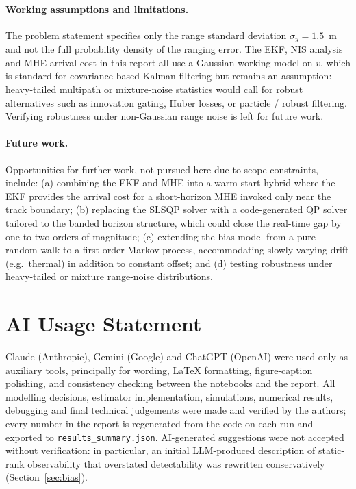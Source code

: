 \documentclass[11pt,a4paper]{article}
\newcommand{\code}[1]{\texttt{#1}}
\begin{document}
\paragraph{Working assumptions and limitations.}
The problem statement specifies only the range standard deviation
$\sigma_y=1.5$~m and not the full probability density of the
ranging error. The EKF, NIS analysis and MHE arrival cost in this
report all use a Gaussian working model on $v$, which is standard
for covariance-based Kalman filtering but remains an assumption:
heavy-tailed multipath or mixture-noise statistics would call for
robust alternatives such as innovation gating, Huber losses, or
particle / robust filtering. Verifying robustness under non-Gaussian
range noise is left for future work.

\paragraph{Future work.}
Opportunities for further work, not pursued here due to scope
constraints, include: (a) combining the EKF and MHE into a warm-start
hybrid where the EKF provides the arrival cost for a short-horizon MHE
invoked only near the track boundary; (b) replacing the SLSQP solver
with a code-generated QP solver tailored to the banded horizon
structure, which could close the real-time gap by one to two orders of
magnitude; (c) extending the bias model from a pure random walk to a
first-order Markov process, accommodating slowly varying drift
(e.g.\ thermal) in addition to constant offset; and (d) testing
robustness under heavy-tailed or mixture range-noise distributions.

\section*{AI Usage Statement}
Claude (Anthropic), Gemini (Google) and ChatGPT (OpenAI) were used
only as auxiliary tools, principally for wording, \LaTeX{} formatting,
figure-caption polishing, and consistency checking between the
notebooks and the report. All modelling decisions, estimator
implementation, simulations, numerical results, debugging and final
technical judgements were made and verified by the authors; every
number in the report is regenerated from the code on each run and
exported to \code{results\_summary.json}. AI-generated suggestions
were not accepted without verification: in particular, an initial
LLM-produced description of static-rank observability that overstated
detectability was rewritten conservatively (Section~\ref{sec:bias}).
\end{document}
